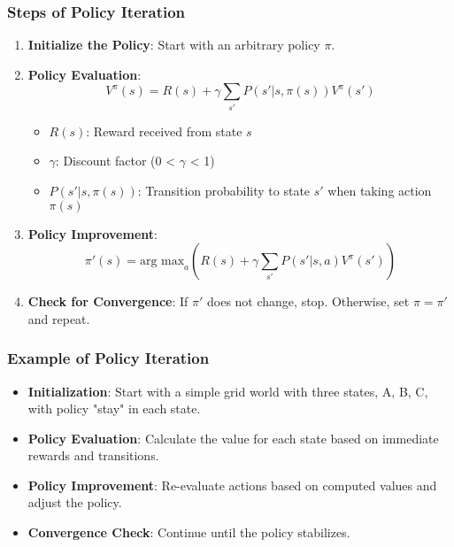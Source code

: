 \documentclass[aspectratio=169]{beamer}
\begin{document}
\begin{frame}[fragile]
    \frametitle{Steps of Policy Iteration}
    \begin{enumerate}
        \item \textbf{Initialize the Policy}: Start with an arbitrary policy \( \pi \).
        \item \textbf{Policy Evaluation}:
            \begin{equation}
                V^\pi(s) = R(s) + \gamma \sum_{s'} P(s'|s, \pi(s)) V^\pi(s')
            \end{equation}
            \begin{itemize}
                \item \( R(s) \): Reward received from state \( s \)
                \item \( \gamma \): Discount factor (0 < \(\gamma\) < 1)
                \item \( P(s'|s, \pi(s)) \): Transition probability to state \( s' \) when taking action \( \pi(s) \)
            \end{itemize}
        \item \textbf{Policy Improvement}:
            \begin{equation}
                \pi'(s) = \text{arg max}_{a} \left( R(s) + \gamma \sum_{s'} P(s'|s, a) V^\pi(s') \right)
            \end{equation}
        \item \textbf{Check for Convergence}: If \( \pi' \) does not change, stop. Otherwise, set \( \pi = \pi' \) and repeat.
    \end{enumerate}
\end{frame}

\begin{frame}[fragile]
    \frametitle{Example of Policy Iteration}
    \begin{itemize}
        \item \textbf{Initialization}: Start with a simple grid world with three states, A, B, C, with policy "stay" in each state.
        \item \textbf{Policy Evaluation}: Calculate the value for each state based on immediate rewards and transitions.
        \item \textbf{Policy Improvement}: Re-evaluate actions based on computed values and adjust the policy.
        \item \textbf{Convergence Check}: Continue until the policy stabilizes.
    \end{itemize}
\end{frame}
\end{document}
